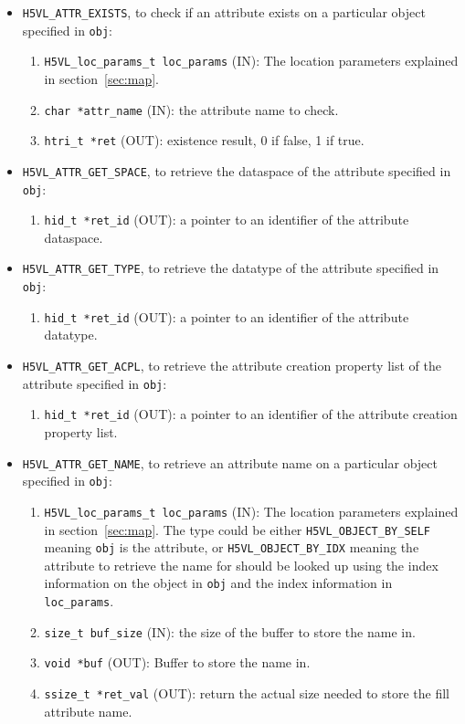 \begin{itemize}
\item {\tt H5VL\_ATTR\_EXISTS}, to check if an attribute exists on a
  particular object specified in {\tt obj}:
  \begin{enumerate}
  \item {\tt H5VL\_loc\_params\_t loc\_params} (IN): The location parameters
    explained in section~\ref{sec:map}.
  \item {\tt char *attr\_name} (IN): the attribute name to check.
  \item {\tt htri\_t *ret} (OUT): existence result, 0 if false, 1 if true.
  \end{enumerate}

\item {\tt H5VL\_ATTR\_GET\_SPACE}, to retrieve the dataspace of the
  attribute specified in {\tt obj}:
  \begin{enumerate}
  \item {\tt hid\_t *ret\_id} (OUT): a pointer to an identifier of the
    attribute dataspace.
  \end{enumerate}

\item {\tt H5VL\_ATTR\_GET\_TYPE}, to retrieve the datatype of the
  attribute specified in {\tt obj}:
  \begin{enumerate}
  \item {\tt hid\_t *ret\_id} (OUT): a pointer to an identifier of the
    attribute datatype.
  \end{enumerate}

\item {\tt H5VL\_ATTR\_GET\_ACPL}, to retrieve the attribute creation
  property list of the attribute specified in {\tt obj}:
  \begin{enumerate}
  \item {\tt hid\_t *ret\_id} (OUT): a pointer to an identifier of the
    attribute creation property list.
  \end{enumerate}

\item {\tt H5VL\_ATTR\_GET\_NAME}, to retrieve an attribute name on a
  particular object specified in {\tt obj}:
  \begin{enumerate}
  \item {\tt H5VL\_loc\_params\_t loc\_params} (IN): The location parameters
    explained in section~\ref{sec:map}. The type could be either
    {\tt H5VL\_OBJECT\_BY\_SELF} meaning {\tt obj} is the attribute,
    or {\tt H5VL\_OBJECT\_BY\_IDX} meaning the attribute to retrieve
    the name for should be looked up using the index information on
    the object in {\tt obj} and the index information in {\tt loc\_params}.
  \item {\tt size\_t buf\_size} (IN): the size of the buffer to store
    the name in.
  \item {\tt void *buf} (OUT): Buffer to store the name in.
  \item {\tt ssize\_t *ret\_val} (OUT): return the actual size needed
    to store the fill attribute name.
  \end{enumerate}


\end{itemize}
